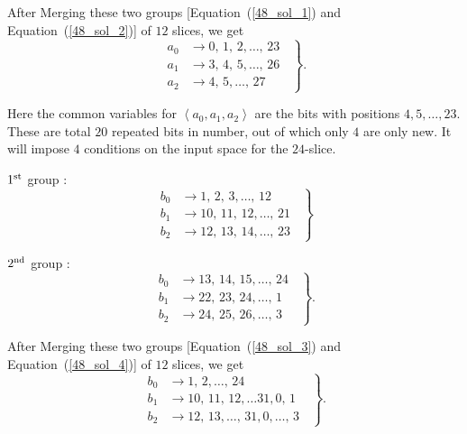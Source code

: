 After Merging these two groups [Equation~(\ref{48_sol_1}) and 
Equation~(\ref{48_sol_2})] of $12$ slices, we get
\begin{equation}
	\left.
	\begin{aligned}       
    a_0 &\rightarrow 0,\, 1,\, 2,\ldots ,\, 23\\
    a_1 & \rightarrow 3,\, 4,\, 5,\ldots ,\, 26\\
    a_2 & \rightarrow 4,\, 5,\ldots,\, 27
    \end{aligned}
	\;\;\right\}.
\end{equation}

Here the common variables for $\left< a_0, a_1,a_2\right>$ are the bits with positions
$4, 5,\ldots, 23$. These are total $20$ repeated bits in number, out of which only $4$ are only new. It will impose $4$ conditions on the input space for the $24$-slice.

$1^{\rm st}$ group :
\begin{equation}\label{48_sol_3}
	\left.
	\begin{aligned}
    	b_0 &\rightarrow 1,\, 2,\, 3, \ldots ,\, 12\\
    	b_1 &\rightarrow 10,\,11, \,12, \ldots ,\, 21\\
    	b_2 &\rightarrow 12,\,13,\,14, \ldots ,\, 23
    \end{aligned}
    \;\;\right\}
\end{equation}

$2^{\rm nd}$ group :
\begin{equation}\label{48_sol_4}
	\left.
	\begin{aligned}    
      b_0 & \rightarrow 13,\, 14,\, 15, \ldots , \,24\\
      b_1 & \rightarrow 22,\, 23, \,24, \ldots , \,1\\
      b_2 & \rightarrow 24,\, 25,\,26, \ldots , \,3
    \end{aligned}
	\;\;\right\}.
\end{equation}

After Merging these two groups [Equation~(\ref{48_sol_3}) and 
Equation~(\ref{48_sol_4})] of $12$ slices, we get
\begin{equation}
	\left.
	\begin{aligned}       
    b_0 &\rightarrow 1,\, 2,\ldots ,\, 24\\
    b_1 & \rightarrow 10,\, 11,\, 12,\ldots 31, 0,\, 1\\
    b_2 & \rightarrow 12,\, 13,\ldots,\, 31, 0,  \ldots,\, 3
    \end{aligned}
	\;\;\right\}.
\end{equation}

